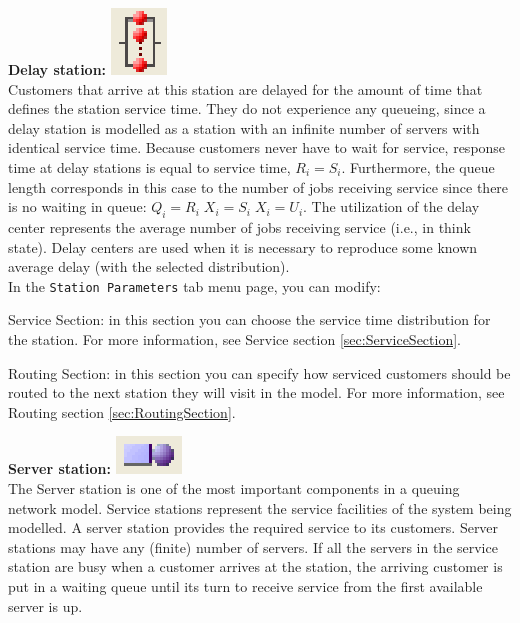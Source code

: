 \begin{enumerate*}
\item \textbf{Delay station:} \includegraphics[scale=0.5]{img/jsim/delay.eps}\\
Customers that arrive at this station are delayed for the amount
of time that defines the station service time. They do not
experience any queueing, since a delay station is modelled as a
station with an infinite number of servers with identical service
time. Because customers never have to wait for service, response
time at delay stations is equal to service time, $R_i= S_i$.
Furthermore, the queue length corresponds in this case to the
number of jobs receiving service since there is no waiting in
queue: $Q_i = R_i\;X_i = S_i\;X_i = U_i$. The utilization of the
delay center represents the average number of jobs receiving
service (i.e., in think state). Delay centers are used when it is
necessary to reproduce some known average delay (with the selected
distribution).\\
In the \texttt{Station Parameters} tab menu page, you can modify:
\begin{description*}
\item[Service Section:]
in this section you can choose the service time distribution for the station.
For more information, see Service section \autoref{sec:ServiceSection}.
\item[Routing Section:]
in this section you can specify how serviced customers should be routed to the next station they will visit in the model.
For more information, see Routing section \autoref{sec:RoutingSection}.
\end{description*}
\item \textbf{Server station:} \includegraphics[scale=0.5]{img/jsim/server.eps}\\
The Server station is one of the most important components in a queuing network model. Service stations represent the service facilities of the system being modelled. A server station provides the required service to its customers. Server stations may have any (finite) number of servers. If all the servers in the service station are busy when a customer arrives at the station, the arriving customer is put in a waiting queue until its turn to receive service from the first available server is up.

\end{enumerate*}

